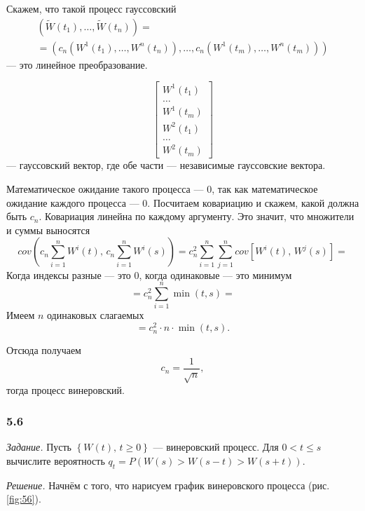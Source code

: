 Скажем, что такой процесс гауссовский
\begin{gather*}
  \left( \tilde{W} \left( t_1 \right), \dotsc, \tilde{W} \left( t_n \right) \right) = \\
  = \left(
    c_n \left( W^1 \left( t_1 \right), \dotsc, W^n \left( t_n \right) \right), \dotsc,
    c_n \left( W^1 \left( t_m \right), \dotsc, W^n \left( t_m \right) \right)
  \right)
\end{gather*}
--- это линейное преобразование.

$$ \begin{bmatrix}
    W^1 \left( t_1 \right) \\
    \dotsc \\
    W^1 \left( t_m \right) \\
    W^2 \left( t_1 \right) \\
    \dotsc \\
    W^2 \left( t_m \right)
  \end{bmatrix}$$
--- гауссовский вектор, где обе части --- независимые гауссовские вектора.

Математическое ожидание такого процесса --- 0, так как математическое ожидание каждого процесса ---
0.
Посчитаем ковариацию и скажем, какой должна быть $c_n.$
Ковариация линейна по каждому аргументу.
Это значит, что множители и суммы выносятся
$$cov \left(
    c_n \sum \limits_{i = 1}^n W^i \left( t \right), \,
    c_n \sum \limits_{i = 1}^n W^i \left( s \right)
  \right) =
  c_n^2 \sum \limits_{i = 1}^n
    \sum \limits_{j = 1}^n cov \left[ W^i \left( t \right), \, W^j \left( s \right) \right] =$$
Когда индексы разные --- это 0, когда одинаковые --- это минимум
$$= c_n^2 \sum \limits_{i = 1}^n \min \left( t, s \right) =$$
Имеем $n$ одинаковых слагаемых
$$= c_n^2 \cdot n \cdot \min \left( t, s \right).$$

Отсюда получаем
$$c_n =
  \frac{1}{ \sqrt{n}},$$
тогда процесс винеровский.

\subsubsection*{5.6}

\textit{Задание.}
Пусть $ \left\{ W \left( t \right), \, t \geq 0 \right\} $ --- винеровский процесс.
Для $0 < t \leq s$ вычислите вероятность
$q_t =
  P \left( W \left( s \right) > W \left( s - t \right) > W \left( s + t \right) \right) $.

\textit{Решение.}
Начнём с того, что нарисуем график винеровского процесса (рис. \ref{fig:56}).

